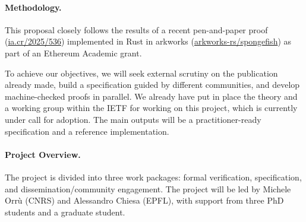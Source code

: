 \documentclass{article}
\begin{document}
\paragraph{Methodology.}
This proposal closely follows the results of a recent pen-and-paper proof (\href{https://eprint.iacr.org/2025/536.pdf}{ia.cr/2025/536}) implemented in Rust in arkworks (\href{https://github.com/arkworks-rs/spongefish}{arkworks-rs/spongefish}) as part of an Ethereum Academic grant.

To achieve our objectives, we will seek external scrutiny on the publication already made, build a specification guided by different communities, and develop machine-checked proofs in parallel. We already have put in place the theory and a working group within the IETF for working on this project, which is currently under call for adoption. The main outputs will be a practitioner-ready specification and a reference implementation.


\paragraph{Project Overview.}
The project is divided into three work packages: formal verification, specification, and dissemination/community engagement. The project will be led by Michele Orrù (CNRS) and Alessandro Chiesa (EPFL), with support from three PhD students and a graduate student.
\end{document}
